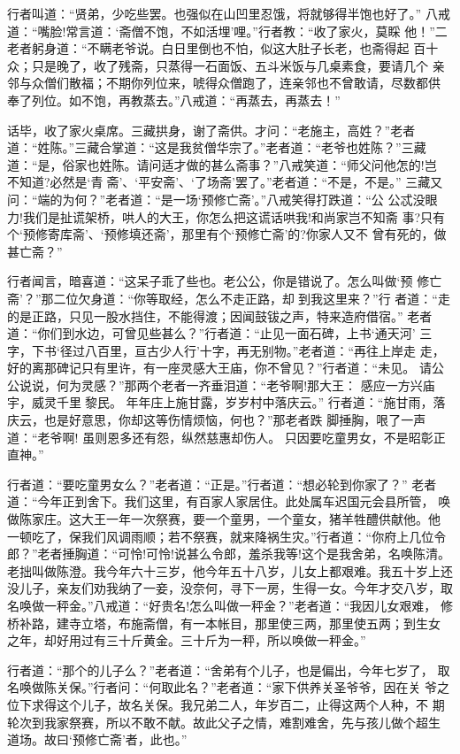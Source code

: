 行者叫道：“贤弟，少吃些罢。也强似在山凹里忍饿，将就够得半饱也好了。”
八戒道：“嘴脸!常言道：‘斋僧不饱，不如活埋’哩。”行者教：“收了家火，莫睬
他！”二老者躬身道：“不瞒老爷说。白日里倒也不怕，似这大肚子长老，也斋得起
百十众；只是晚了，收了残斋，只蒸得一石面饭、五斗米饭与几桌素食，要请几个
亲邻与众僧们散福；不期你列位来，唬得众僧跑了，连亲邻也不曾敢请，尽数都供
奉了列位。如不饱，再教蒸去。”八戒道：“再蒸去，再蒸去！”

话毕，收了家火桌席。三藏拱身，谢了斋供。才问：“老施主，高姓？”老者
道：“姓陈。”三藏合掌道：“这是我贫僧华宗了。”老者道：“老爷也姓陈？”三藏
道：“是，俗家也姓陈。请问适才做的甚么斋事？”八戒笑道：“师父问他怎的!岂
不知道?必然是‘青斋’、‘平安斋’、‘了场斋’罢了。”老者道：“不是，不是。”
三藏又问：“端的为何？”老者道：“是一场‘预修亡斋’。”八戒笑得打跌道：“公
公忒没眼力!我们是扯谎架桥，哄人的大王，你怎么把这谎话哄我!和尚家岂不知斋
事?只有个‘预修寄库斋’、‘预修填还斋’，那里有个‘预修亡斋’的?你家人又不
曾有死的，做甚亡斋？”

行者闻言，暗喜道：“这呆子乖了些也。老公公，你是错说了。怎么叫做‘预
修亡斋’？”那二位欠身道：“你等取经，怎么不走正路，却到我这里来？”行
者道：“走的是正路，只见一股水挡住，不能得渡；因闻鼓钹之声，特来造府借宿。”
老者道：“你们到水边，可曾见些甚么？”行者道：“止见一面石碑，上书‘通天河’
三字，下书‘径过八百里，亘古少人行’十字，再无别物。”老者道：“再往上岸走
走，好的离那碑记只有里许，有一座灵感大王庙，你不曾见？”行者道：“未见。
请公公说说，何为灵感？”那两个老者一齐垂泪道：“老爷啊!那大王：
感应一方兴庙宇，威灵千里黎民。
年年庄上施甘露，岁岁村中落庆云。”
行者道：“施甘雨，落庆云，也是好意思，你却这等伤情烦恼，何也？”那老者跌
脚捶胸，哏了一声道：“老爷啊!
虽则恩多还有怨，纵然慈惠却伤人。
只因要吃童男女，不是昭彰正直神。”

行者道：“要吃童男女么？”老者道：“正是。”行者道：“想必轮到你家了？”
老者道：“今年正到舍下。我们这里，有百家人家居住。此处属车迟国元会县所管，
唤做陈家庄。这大王一年一次祭赛，要一个童男，一个童女，猪羊牲醴供献他。他
一顿吃了，保我们风调雨顺；若不祭赛，就来降祸生灾。”行者道：“你府上几位令
郎？”老者捶胸道：“可怜!可怜!说甚么令郎，羞杀我等!这个是我舍弟，名唤陈清。
老拙叫做陈澄。我今年六十三岁，他今年五十八岁，儿女上都艰难。我五十岁上还
没儿子，亲友们劝我纳了一妾，没奈何，寻下一房，生得一女。今年才交八岁，取
名唤做一秤金。”八戒道：“好贵名!怎么叫做一秤金？”老者道：“我因儿女艰难，
修桥补路，建寺立塔，布施斋僧，有一本帐目，那里使三两，那里使五两；到生女
之年，却好用过有三十斤黄金。三十斤为一秤，所以唤做一秤金。”

行者道：“那个的儿子么？”老者道：“舍弟有个儿子，也是偏出，今年七岁了，
取名唤做陈关保。”行者问：“何取此名？”老者道：“家下供养关圣爷爷，因在关
爷之位下求得这个儿子，故名关保。我兄弟二人，年岁百二，止得这两个人种，不
期轮次到我家祭赛，所以不敢不献。故此父子之情，难割难舍，先与孩儿做个超生
道场。故曰‘预修亡斋’者，此也。”

